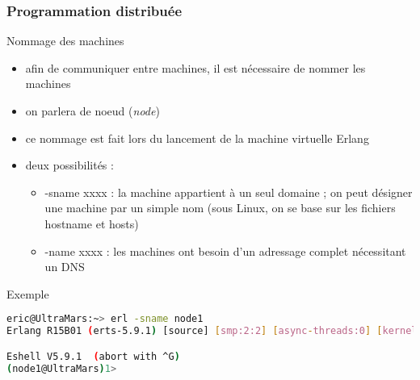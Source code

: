 \begin{frame}[fragile]
  \frametitle{Programmation distribuée}

  \begin{block}{Nommage des machines}
    \begin{itemize}
    \item afin de communiquer entre machines, il est nécessaire de nommer les
      machines
    \item on parlera de noeud (\textit{node})
    \item ce nommage est fait lors du lancement de la machine virtuelle
      Erlang
    \item deux possibilités :
      \begin{itemize}
      \item -sname xxxx : la machine appartient à un seul domaine ; on peut
        désigner une machine par un simple nom (sous Linux, on se base sur
        les fichiers hostname et hosts)
      \item -name xxxx : les machines ont besoin d'un adressage complet
        nécessitant un DNS
      \end{itemize}
    \end{itemize}
  \end{block}

  \begin{exampleblock}{Exemple}
    \begin{lstlisting}[language=bash]
eric@UltraMars:~> erl -sname node1
Erlang R15B01 (erts-5.9.1) [source] [smp:2:2] [async-threads:0] [kernel-poll:false]

Eshell V5.9.1  (abort with ^G)
(node1@UltraMars)1>
    \end{lstlisting}
  \end{exampleblock}

\end{frame}

